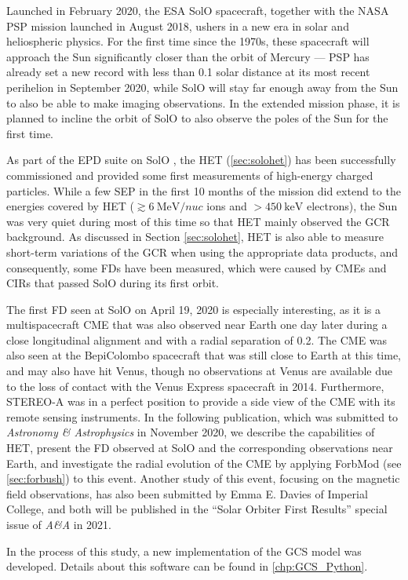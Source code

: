 Launched in February 2020, the ESA \ac{SolO} spacecraft, together with the NASA \ac{PSP} mission launched in August 2018, ushers in a new era in solar and heliospheric physics. For the first time since the 1970s, these spacecraft will approach the Sun significantly closer than the orbit of Mercury --- \ac{PSP} has already set a new record with less than \SI{0.1}{\AU} solar distance at its most recent perihelion in September 2020, while \ac{SolO} will stay far enough away from the Sun to also be able to make imaging observations. In the extended mission phase, it is planned to incline the orbit of \ac{SolO} to also observe the poles of the Sun for the first time.

As part of the \ac{EPD} suite on \ac{SolO} \citep{RodriguezPacheco-2019-EPD}, the \ac{HET} (\autoref{sec:solohet}) has been successfully commissioned and provided some first measurements of high-energy charged particles. While a few \ac{SEP} in the first 10 months of the mission did extend to the energies covered by \ac{HET} ($\gtrsim\SI{6}{\mega\electronvolt\per nuc}$ ions and $>\SI{450}{\kilo\electronvolt}$ electrons), the Sun was very quiet during most of this time so that \ac{HET} mainly observed the \ac{GCR} background. As discussed in Section \autoref{sec:solohet}, \ac{HET} is also able to measure short-term variations of the \ac{GCR} when using the appropriate data products, and consequently, some \acp{FD} have been measured, which were caused by \acp{CME} and \acp{CIR} that passed \ac{SolO} during its first orbit.

The first \ac{FD} seen at \ac{SolO} on April 19, 2020 is especially interesting, as it is a multispacecraft \ac{CME} that was also observed near Earth one day later during a close longitudinal alignment and with a radial separation of \SI{0.2}{\AU}. The \ac{CME} was also seen at the BepiColombo spacecraft that was still close to Earth at this time, and may also have hit Venus, though no observations at Venus are available due to the loss of contact with the Venus Express spacecraft in 2014. Furthermore, \ac{STEREO}-A was in a perfect position to provide a side view of the \ac{CME} with its remote sensing instruments. In the following publication, which was submitted to \textit{Astronomy \& Astrophysics} in November 2020, we describe the capabilities of \ac{HET}, present the \ac{FD} observed at \ac{SolO} and the corresponding observations near Earth, and investigate the radial evolution of the \ac{CME} by applying \acs{ForbMod} (see \autoref{sec:forbush}) to this event. Another study of this event, focusing on the magnetic field observations, has also been submitted by Emma E. Davies of Imperial College, and both will be published in the ``Solar Orbiter First Results'' special issue of \textit{A\&A} in 2021.

In the process of this study, a new implementation of the \ac{GCS} model \citep{Thernisien-2011-GCS} was developed. Details about this software can be found in \autoref{chp:GCS_Python}.

